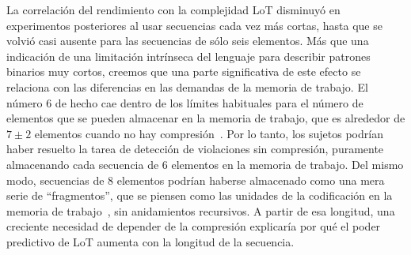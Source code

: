 La correlación del rendimiento con la complejidad LoT disminuyó en experimentos posteriores al usar secuencias cada vez más cortas, hasta que se volvió casi ausente para las secuencias de sólo seis elementos. Más que una indicación de una limitación intrínseca del lenguaje para describir patrones binarios muy cortos, creemos que una parte significativa de este efecto se relaciona con las diferencias en las demandas de la memoria de trabajo. El número 6 de hecho cae dentro de los límites habituales para el número de elementos que se pueden almacenar en la memoria de trabajo, que es alrededor de $7 \pm 2$ elementos cuando no hay compresión~\cite{f16,f29}. Por lo tanto, los sujetos podrían haber resuelto la tarea de detección de violaciones sin compresión, puramente almacenando cada secuencia de 6 elementos en la memoria de trabajo. Del mismo modo, secuencias de 8 elementos podrían haberse almacenado como una mera serie de ``fragmentos'', que se piensen como las unidades de la codificación en la memoria de trabajo~\cite{f16,f86,f108,f109}, sin anidamientos recursivos. A partir de esa longitud, una creciente necesidad de depender de la compresión explicaría por qué el poder predictivo de LoT aumenta con la longitud de la secuencia.


